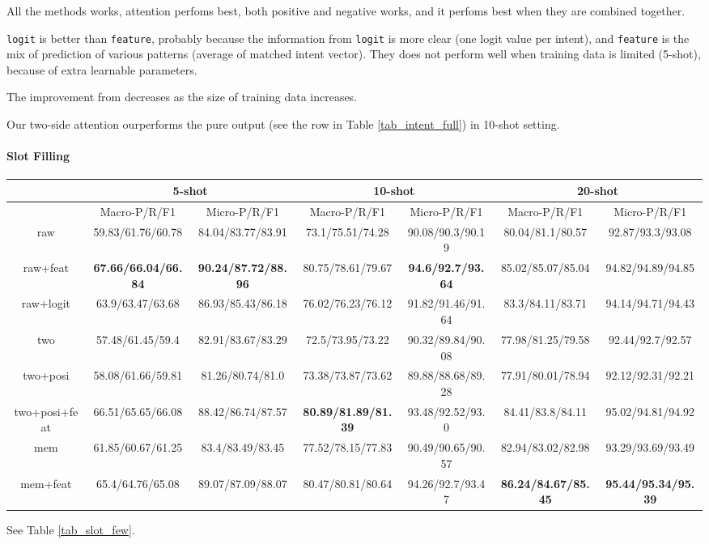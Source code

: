 All the methods works, attention perfoms best, both positive and negative works, and it perfoms best when they are combined together.

\texttt{logit} is better than \texttt{feature}, probably because the information from \texttt{logit} is more clear (one logit value per intent), and \texttt{feature} is the mix of prediction of various patterns (average of matched intent vector). They does not perform well when training data is limited (5-shot), because of extra learnable parameters.

The improvement from \RE decreases as the size of training data increases.

Our two-side attention ourperforms the pure \RE output (see the \RE row in Table \ref{tab_intent_full}) in 10-shot setting. 


\paragraph{Slot Filling}

\begin{table*}
\setlength{\tabcolsep}{0.23em}
\centering
\small{
\begin{tabular}{|c|c|c|c|c|c|c|}

\hline
  & \multicolumn{2}{|c|}{5-shot} & \multicolumn{2}{|c|}{10-shot} & \multicolumn{2}{|c|}{20-shot}  \\
 \hline
  & Macro-P/R/F1 & Micro-P/R/F1 & Macro-P/R/F1 & Micro-P/R/F1  & Macro-P/R/F1 & Micro-P/R/F1   \\
\hline
raw & 59.83/61.76/60.78 & 84.04/83.77/83.91 & 73.1/75.51/74.28  & 90.08/90.3/90.19 & 80.04/81.1/80.57 & 92.87/93.3/93.08 \\
\hline
raw+feat & \textbf{67.66/66.04/66.84} & \textbf{90.24/87.72/88.96} & 80.75/78.61/79.67 & \textbf{94.6/92.7/93.64} & 85.02/85.07/85.04 & 94.82/94.89/94.85 \\
\hline
raw+logit & 63.9/63.47/63.68 & 86.93/85.43/86.18 & 76.02/76.23/76.12 & 91.82/91.46/91.64  & 83.3/84.11/83.71 & 94.14/94.71/94.43 \\
\hline
two & 57.48/61.45/59.4 & 82.91/83.67/83.29 & 72.5/73.95/73.22 & 90.32/89.84/90.08 & 77.98/81.25/79.58 & 92.44/92.7/92.57 \\
\hline
two+posi & 58.08/61.66/59.81 & 81.26/80.74/81.0 & 73.38/73.87/73.62 & 89.88/88.68/89.28 & 77.91/80.01/78.94 & 92.12/92.31/92.21 \\
\hline
two+posi+feat & 66.51/65.65/66.08 & 88.42/86.74/87.57 & \textbf{80.89/81.89/81.39} & 93.48/92.52/93.0 & 84.41/83.8/84.11 & 95.02/94.81/94.92\\
\hline
mem & 61.85/60.67/61.25 & 83.4/83.49/83.45 & 77.52/78.15/77.83  & 90.49/90.65/90.57 & 82.94/83.02/82.98 & 93.29/93.69/93.49 \\
\hline
mem+feat & 65.4/64.76/65.08 & 89.07/87.09/88.07 & 80.47/80.81/80.64 & 94.26/92.7/93.47 & \textbf{86.24/84.67/85.45} & \textbf{95.44/95.34/95.39} \\
\hline
\end{tabular}
}
\caption{Slot Filling Result on Few-Shot Data}
\label{tab_slot_few}
\end{table*}
See Table \ref{tab_slot_few}.


